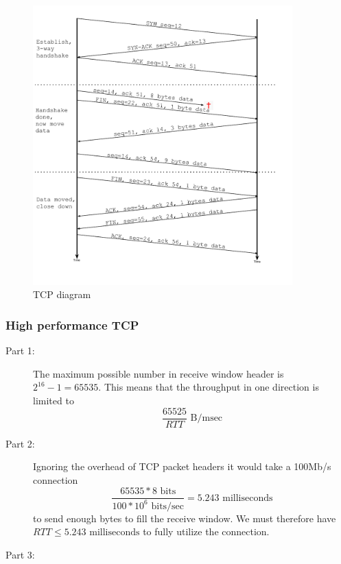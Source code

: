 \begin{description}
\begin{figure}[!h]
        \includegraphics[width=10cm]{131p3-pic}
        \caption{TCP diagram}
        \end{figure}
\end{description}

\subsubsection{High performance TCP}
\begin{description}
    \item[Part 1:] The maximum possible number in receive window header is $2^{16}-1 = 65535$. This means that the throughput in one
        direction is limited to \[\frac{65525}{RTT} \text{ B/msec}\] %
    \item[Part 2:] Ignoring the overhead of TCP packet headers it would take a 100Mb/s connection
        \[ \frac{65535 * 8 \text{ bits}}{100 * 10^{6} \text{ bits/sec}} = 5.243 \text{ milliseconds} \]
        to send enough bytes to fill the receive window. We must therefore have $RTT \leq 5.243 \text{ milliseconds}$ to fully utilize
        the connection. %
    \item[Part 3:]
\end{description}

